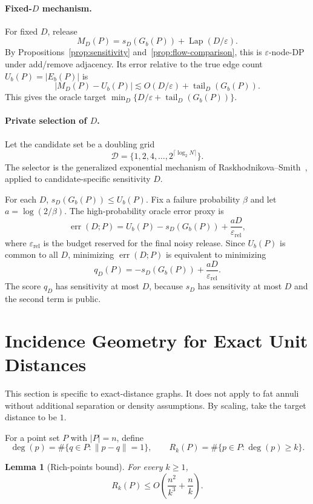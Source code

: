 \documentclass[11pt]{article}
\newtheorem{lemma}[theorem]{Lemma}
\DeclareMathOperator{\Lap}{Lap}
\newcommand{\eps}{\varepsilon}
\newcommand{\calD}{\mathcal{D}}
\newcommand{\tail}{\operatorname{tail}}
\begin{document}
\paragraph{Fixed-\(D\) mechanism.}
For fixed \(D\), release
\[
M_D(P)=s_D(G_b(P))+\Lap(D/\eps).
\]
By Propositions~\ref{prop:sensitivity} and~\ref{prop:flow-comparison}, this is \(\eps\)-node-DP under add/remove adjacency. Its error relative to the true edge count \(U_b(P)=|E_b(P)|\) is
\[
|M_D(P)-U_b(P)|\lesssim O(D/\eps)+\tail_D(G_b(P)).
\]
This gives the oracle target \(\min_D\{D/\eps+\tail_D(G_b(P))\}\).

\paragraph{Private selection of \(D\).}
Let the candidate set be a doubling grid
\[
\calD=\{1,2,4,\ldots,2^{\lceil\log_2 N\rceil}\}.
\]
The selector is the generalized exponential mechanism of Raskhodnikova--Smith~\cite[Theorem~1.4]{RS16}, applied to candidate-specific sensitivity \(D\).

For each \(D\), \(s_D(G_b(P))\le U_b(P)\). Fix a failure probability \(\beta\) and let \(a=\log(2/\beta)\). The high-probability oracle error proxy is
\[
\operatorname{err}(D;P)=U_b(P)-s_D(G_b(P))+\frac{aD}{\eps_{\mathrm{rel}}},
\]
where \(\eps_{\mathrm{rel}}\) is the budget reserved for the final noisy release. Since \(U_b(P)\) is common to all \(D\), minimizing \(\operatorname{err}(D;P)\) is equivalent to minimizing
\[
q_D(P)=-s_D(G_b(P))+\frac{aD}{\eps_{\mathrm{rel}}}.
\]
The score \(q_D\) has sensitivity at most \(D\), because \(s_D\) has sensitivity at most \(D\) and the second term is public.

\section{Incidence Geometry for Exact Unit Distances}

This section is specific to exact-distance graphs. It does not apply to fat annuli without additional separation or density assumptions. By scaling, take the target distance to be \(1\).

For a point set \(P\) with \(|P|=n\), define
\[
\deg(p)=\#\{q\in P:\|p-q\|=1\},\qquad
R_k(P)=\#\{p\in P:\deg(p)\ge k\}.
\]

\begin{lemma}[Rich-points bound]
\label{lem:rich}
For every \(k\ge 1\),
\[
R_k(P)\le O\!\left(\frac{n^2}{k^3}+\frac{n}{k}\right).
\]
\end{lemma}
\end{document}
